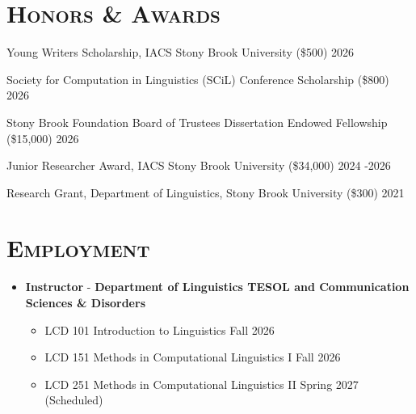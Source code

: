 \documentclass[a4paper,11pt]{article}
\newcommand{\cvsection}[1]{\section*{\Large \textsc{#1}}\vspace{-1em}}
\newcommand{\cvsubsection}[1]{\noindent{\textsc{#1}}}
\begin{document}
\cvsection{Honors \& Awards}
\begin{etaremune}[itemsep=0.3em]
\item Young Writers Scholarship, IACS Stony Brook University (\$500)  \hfill 2026
    \item Society for Computation in Linguistics (SCiL) Conference Scholarship (\$800) \hfill 2026
\item Stony Brook Foundation Board of Trustees Dissertation Endowed Fellowship (\$15,000) \hfill 2026
\item Junior Researcher Award, IACS Stony Brook University (\$34,000)  \hfill 2024 -2026
    \item Research Grant, Department of Linguistics, Stony Brook University (\$300)   \hfill 2021
\end{etaremune}

\cvsection{Employment}
\cvsubsection{CUNY Quees College}
\begin{itemize}[itemsep=0em, parsep=0.2em, topsep=0em]
\item \textbf{Instructor} - \textbf{Department of Linguistics TESOL and Communication Sciences \& Disorders}  
\begin{itemize}[itemsep=0em, parsep=0.2em, topsep=0em]
    \item LCD 101   \quad Introduction to Linguistics \hfill Fall 2026
    \item LCD 151   \quad Methods in Computational Linguistics I \hfill Fall 2026
    \item LCD 251   \quad Methods in Computational Linguistics II \hfill Spring 2027 (Scheduled) \\
\end{itemize}
\end{itemize}
\end{document}
